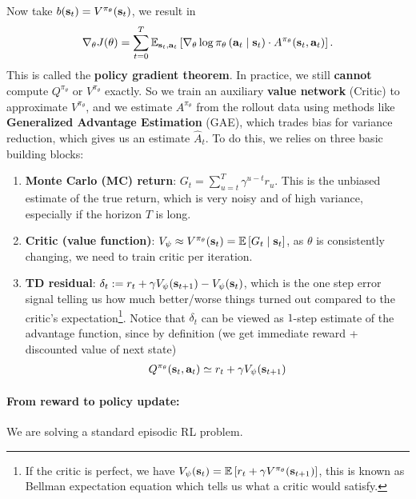 \documentclass[11pt]{article}  %
\begin{document}
Now take $b(\mathbf{s}_t) = V^{\pi_\theta}(\mathbf{s}_t)$, we result in 
\begin{align*}
  \nabla_{\theta} J(\theta) = \sum_{t=0}^{T}\mathbb{E}_{\mathbf{s}_t, \mathbf{a}_t}\left[\nabla_{\theta}\log \pi_{\theta}\left( \mathbf{a}_t \mid \mathbf{s}_t \right)\cdot A^{\pi_\theta}(\mathbf{s}_t, \mathbf{a}_t)\right].
\end{align*}
This is called the \textbf{policy gradient theorem}.
In practice, we still \textbf{cannot} compute $Q^{\pi_{\theta}}$ or $V^{\pi_\theta}$ exactly. 
So we train an auxiliary \textbf{value network} (Critic) to approximate $V^{\pi_\theta}$, and we estimate $A^{\pi_\theta}$ from the rollout data using methods like \textbf{Generalized Advantage Estimation} (GAE), which trades bias for variance reduction, which gives us an estimate $\hat{A}_t$.
To do this, we relies on three basic building blocks:
\begin{enumerate}
  \item \textbf{Monte Carlo (MC) return}: $G_t = \sum_{u=t}^{T}\gamma^{u - t}r_u$. 
  This is the unbiased estimate of the true return, which is very noisy and of high variance, especially if the horizon $T$ is long.

  \item \textbf{Critic (value function)}: $V_\psi \approx V^{\pi_\theta}(\mathbf{s}_t) = \mathbb{E}\left[G_t \mid \mathbf{s}_t\right]$, as $\theta$ is consistently changing, we need to train critic per iteration. 
  
  \item \textbf{TD residual}: $\delta_t := r_t + \gamma V_{\psi}(\mathbf{s}_{t+1}) - V_\psi(\mathbf{s}_t)$, which is the one step error signal telling us how much better/worse things turned out compared to the critic's expectation\footnote{If the critic is perfect, we have $V_{\psi}(\mathbf{s}_t) = \mathbb{E}\left[r_t + \gamma V^{\pi_\theta}(\mathbf{s}_{t+1})\right]$, this is known as Bellman expectation equation which tells us what a critic would satisfy.}.
  Notice that $\delta_t$ can be viewed as $1$-step estimate of the advantage function, since by definition (we get immediate reward + discounted value of next state)
  \begin{align*}
    Q^{\pi_\theta}(\mathbf{s}_t, \mathbf{a}_t) \simeq r_t + \gamma V_{\psi}(\mathbf{s}_{t+1})
  \end{align*}
\end{enumerate}

\paragraph{From reward to policy update:}
We are solving a standard episodic RL problem.
\end{document}
